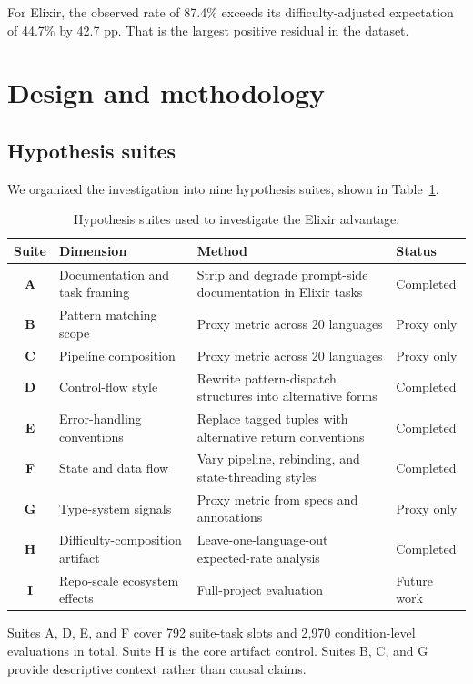 \documentclass[11pt]{article}
\newcommand{\pp}{pp}
\newcommand{\elixir}{Elixir}
\begin{document}
For \elixir{}, the observed rate of 87.4\% exceeds its difficulty-adjusted expectation of 44.7\% by 42.7 \pp{}. That is the largest positive residual in the dataset.

\section{Design and methodology}

\subsection{Hypothesis suites}

We organized the investigation into nine hypothesis suites, shown in Table~\ref{tab:suites}.

\begin{table}[H]
\centering
\caption{Hypothesis suites used to investigate the \elixir{} advantage.}
\label{tab:suites}
\small
\begin{tabularx}{\textwidth}{>{\bfseries}c l X l}
\toprule
Suite & Dimension & Method & Status \\
\midrule
A & Documentation and task framing & Strip and degrade prompt-side documentation in \elixir{} tasks & Completed \\
B & Pattern matching scope & Proxy metric across 20 languages & Proxy only \\
C & Pipeline composition & Proxy metric across 20 languages & Proxy only \\
D & Control-flow style & Rewrite pattern-dispatch structures into alternative forms & Completed \\
E & Error-handling conventions & Replace tagged tuples with alternative return conventions & Completed \\
F & State and data flow & Vary pipeline, rebinding, and state-threading styles & Completed \\
G & Type-system signals & Proxy metric from specs and annotations & Proxy only \\
H & Difficulty-composition artifact & Leave-one-language-out expected-rate analysis & Completed \\
I & Repo-scale ecosystem effects & Full-project evaluation & Future work \\
\bottomrule
\end{tabularx}
\end{table}

Suites A, D, E, and F cover 792 suite-task slots and 2{,}970 condition-level evaluations in total. Suite H is the core artifact control. Suites B, C, and G provide descriptive context rather than causal claims.
\end{document}
